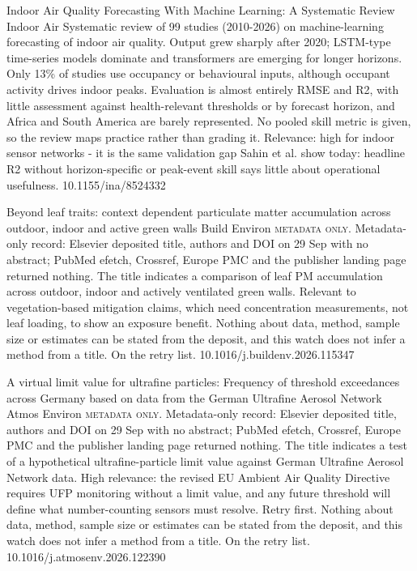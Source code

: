 \documentclass[10pt]{article}
\begin{document}
{Indoor Air Quality Forecasting With Machine Learning: A Systematic Review}
{Indoor Air}
{Systematic review of 99 studies (2010-2026) on machine-learning forecasting of indoor air quality. Output grew sharply after 2020; LSTM-type time-series models dominate and transformers are emerging for longer horizons. Only 13\% of studies use occupancy or behavioural inputs, although occupant activity drives indoor peaks. Evaluation is almost entirely RMSE and R2, with little assessment against health-relevant thresholds or by forecast horizon, and Africa and South America are barely represented. No pooled skill metric is given, so the review maps practice rather than grading it. Relevance: high for indoor sensor networks - it is the same validation gap Sahin et al. show today: headline R2 without horizon-specific or peak-event skill says little about operational usefulness.}
{10.1155/ina/8524332}

\par{}\baselineskip{}\baselineskip
{}

{Beyond leaf traits: context dependent particulate matter accumulation across outdoor, indoor and active green walls}
{Build Environ}
{\textsc{metadata only.} Metadata-only record: Elsevier deposited title, authors and DOI on 29 Sep with no abstract; PubMed efetch, Crossref, Europe PMC and the publisher landing page returned nothing. The title indicates a comparison of leaf PM accumulation across outdoor, indoor and actively ventilated green walls. Relevant to vegetation-based mitigation claims, which need concentration measurements, not leaf loading, to show an exposure benefit. Nothing about data, method, sample size or estimates can be stated from the deposit, and this watch does not infer a method from a title. On the retry list.}
{10.1016/j.buildenv.2026.115347}

\par{}\baselineskip{}\baselineskip
{}

{A virtual limit value for ultrafine particles: Frequency of threshold exceedances across Germany based on data from the German Ultrafine Aerosol Network}
{Atmos Environ}
{\textsc{metadata only.} Metadata-only record: Elsevier deposited title, authors and DOI on 29 Sep with no abstract; PubMed efetch, Crossref, Europe PMC and the publisher landing page returned nothing. The title indicates a test of a hypothetical ultrafine-particle limit value against German Ultrafine Aerosol Network data. High relevance: the revised EU Ambient Air Quality Directive requires UFP monitoring without a limit value, and any future threshold will define what number-counting sensors must resolve. Retry first. Nothing about data, method, sample size or estimates can be stated from the deposit, and this watch does not infer a method from a title. On the retry list.}
{10.1016/j.atmosenv.2026.122390}
\end{document}
